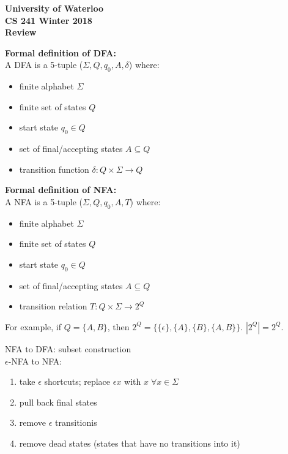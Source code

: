 \documentclass[12pt]{article}
\begin{document}
\begin{center}
	{\Large\bf University of Waterloo}\\
	\vspace{3mm}
	{\Large\bf CS 241 Winter 2018}\\
	\vspace{3mm}
	{\Large\bf Review}\\	
\end{center}
\noindent
\textbf{Formal definition of DFA:}\\

\noindent
A DFA is a 5-tuple ($\Sigma, Q, q_0, A, \delta$) where:
\begin{itemize}
	\item finite alphabet $\Sigma$
	\item finite set of states $Q$
	\item start state $q_0 \in Q$
	\item set of final/accepting states $A \subseteq Q$
	\item transition function $\delta: Q \times \Sigma \rightarrow Q$
\end{itemize}

\noindent
\textbf{Formal definition of NFA:}\\

\noindent
A NFA is a 5-tuple ($\Sigma, Q, q_0, A, T$) where:
\begin{itemize}
	\renewcommand\labelitemi{--}
	\item finite alphabet $\Sigma$
	\item finite set of states $Q$
	\item start state $q_0 \in Q$
	\item set of final/accepting states $A \subseteq Q$
    \item transition relation $T: Q \times \Sigma \rightarrow 2^Q$
\end{itemize}
For example, if $Q = \{A, B\}$, then $2^Q = \{\{ \epsilon \}, \{ A\}  ,\{B \}  ,\{ A, B\}  \}$. $|2^Q| = 2^Q$.

\noindent
NFA to DFA: subset construction\\

\noindent
$\epsilon$-NFA to NFA:
\begin{enumerate}
	\item take $\epsilon$ shortcuts; replace $\epsilon x$ with $x \;\forall x \in \Sigma$
	\item pull back final states
	\item remove $\epsilon$ transitionis
	\item remove dead states (states that have no transitions into it)
\end{enumerate}
\end{document}
